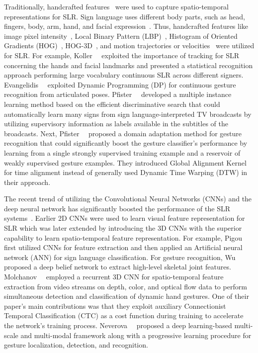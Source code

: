 \documentclass[journal]{IEEEtran}
\begin{document}
Traditionally, handcrafted features~\cite{wang2014similarity, buehler2009learning, pfister2014domain, evangelidis2014continuous, koller2015continuous, monnier2014multi} were used to capture spatio-temporal representations for SLR. Sign language uses different body parts, such as head, fingers, body, arm, hand, and facial expression~\cite{cheok2019review}. Thus, handcrafted features like image pixel intensity~\cite{wang2014similarity}, Local Binary Pattern (LBP)~\cite{wang2014similarity}, Histogram of Oriented Gradients (HOG)~\cite{buehler2009learning, pfister2014domain}, HOG-3D~\cite{koller2015continuous}, and motion trajectories or velocities~\cite{evangelidis2014continuous, koller2015continuous, monnier2014multi} were utilized for SLR. For example, Koller~\etal~\cite{koller2015continuous} exploited the importance of tracking for SLR concerning the hands and facial landmarks and presented a statistical recognition approach performing large vocabulary continuous SLR across different signers. Evangelidis~\etal~\cite{evangelidis2014continuous} exploited Dynamic Programming (DP) for continuous gesture recognition from articulated poses. Pfister~\etal~\cite{pfister2013large} developed a multiple instance learning method based on the efficient discriminative search that could automatically learn many signs from sign language-interpreted TV broadcasts by utilizing supervisory information as labels available in the subtitles of the broadcasts. Next, Pfister~\etal~\cite{pfister2014domain} proposed a domain adaptation method for gesture recognition that could significantly boost the gesture classifier's performance by learning from a single strongly supervised training example and a reservoir of weakly supervised gesture examples. They introduced Global Alignment Kernel for time alignment instead of generally used Dynamic Time Warping (DTW) in their approach.

The recent trend of utilizing the Convolutional Neural Networks (CNNs) and the deep neural network has significantly boosted the performance of the SLR systems~\cite{pigou2014sign, wu2014leveraging, molchanov2016online, neverova2014multi}. Earlier 2D CNNs were used to learn visual feature representation for SLR which was later extended by introducing the 3D CNNs with the superior capability to learn spatio-temporal feature representation. For example, Pigou~\etal~\cite{pigou2014sign} first utilized CNNs for feature extraction and then applied an Artificial neural network (ANN) for sign language classification. For gesture recognition, Wu~\etal~\cite{wu2014leveraging} proposed a deep belief network to extract high-level skeletal joint features. Molchanov~\etal~\cite{molchanov2016online} employed a recurrent 3D CNN for spatio-temporal feature extraction from video streams on depth, color, and optical flow data to perform simultaneous detection and classification of dynamic hand gestures. One of their paper's main contributions was that they exploit auxiliary Connectionist Temporal Classification (CTC) as a cost function during training to accelerate the network's training process. Neverova~\etal~\cite{neverova2014multi} proposed a deep learning-based multi-scale and multi-modal framework along with a progressive learning procedure for gesture localization, detection, and recognition. 
\end{document}
